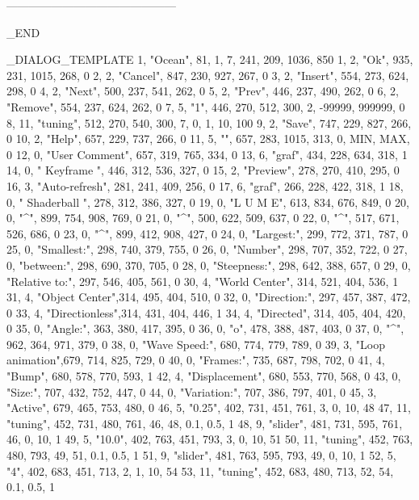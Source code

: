 ---------------------------------------------

_END


_DIALOG_TEMPLATE
1,	"Ocean", 81,	1,	7,	241, 209, 1036, 850
   1,	2,	"Ok",		935, 231, 1015, 268, 0
   2,	2,	"Cancel",	847, 230, 927, 267, 0
   3,	2,	"Insert",	554, 273, 624, 298, 0
   4,	2,	"Next",		500, 237, 541, 262, 0
   5,	2,	"Prev",		446, 237, 490, 262, 0
   6,	2,	"Remove",	554, 237, 624, 262, 0
   7,	5,	"1",		446, 270, 512, 300, 2, -99999, 999999, 0
   8,	11,	"tuning",	512, 270, 540, 300, 7, 0, 1, 10, 100
   9,	2,	"Save",		747, 229, 827, 266, 0
   10,	2,	"Help",		657, 229, 737, 266, 0
   11,	5,	"",		657, 283, 1015, 313, 0, MIN, MAX, 0
   12,	0,	"User Comment",	657, 319, 765, 334, 0
   13,	6,	"graf",		434, 228, 634, 318, 1
   14,	0,	" Keyframe ",	446, 312, 536, 327, 0
   15,	2,	"Preview",	278, 270, 410, 295, 0
   16,	3,	"Auto-refresh",	281, 241, 409, 256, 0
   17,	6,	"graf",		266, 228, 422, 318, 1
   18,	0,	" Shaderball ",	278, 312, 386, 327, 0
   19,	0,	"L U M E",	613, 834, 676, 849, 0
   20,	0,	"^",		899, 754, 908, 769, 0
   21,	0,	"^",		500, 622, 509, 637, 0
   22,	0,	"^",		517, 671, 526, 686, 0
   23,	0,	"^",		899, 412, 908, 427, 0
   24,	0,	"Largest:",	299, 772, 371, 787, 0
   25,	0,	"Smallest:",	298, 740, 379, 755, 0
   26,	0,	"Number",	298, 707, 352, 722, 0
   27,	0,	"between:",	298, 690, 370, 705, 0
   28,	0,	"Steepness:",	298, 642, 388, 657, 0
   29,	0,	"Relative to:",	297, 546, 405, 561, 0
   30,	4,	"World Center",	314, 521, 404, 536, 1
   31,	4,	"Object Center",314, 495, 404, 510, 0
   32,	0,	"Direction:",	297, 457, 387, 472, 0
   33,	4,	"Directionless",314, 431, 404, 446, 1
   34,	4,	"Directed",	314, 405, 404, 420, 0
   35,	0,	"Angle:",	363, 380, 417, 395, 0
   36,	0,	"o",		478, 388, 487, 403, 0
   37,	0,	"^",		962, 364, 971, 379, 0
   38,	0,	"Wave Speed:",	680, 774, 779, 789, 0
   39,	3,	"Loop animation",679, 714, 825, 729, 0
   40,	0,	"Frames:",	735, 687, 798, 702, 0
   41,	4,	"Bump",		680, 578, 770, 593, 1
   42,	4,	"Displacement",	680, 553, 770, 568, 0
   43,	0,	"Size:",	707, 432, 752, 447, 0
   44,	0,	"Variation:",	707, 386, 797, 401, 0
   45,	3,	"Active",	679, 465, 753, 480, 0
   46,	5,	"0.25",		402, 731, 451, 761, 3, 0, 10, 48
   47,	11,	"tuning",	452, 731, 480, 761, 46, 48, 0.1, 0.5, 1
   48,	9,	"slider",	481, 731, 595, 761, 46, 0, 10, 1
   49,	5,	"10.0",		402, 763, 451, 793, 3, 0, 10, 51
   50,	11,	"tuning",	452, 763, 480, 793, 49, 51, 0.1, 0.5, 1
   51,	9,	"slider",	481, 763, 595, 793, 49, 0, 10, 1
   52,	5,	"4",		402, 683, 451, 713, 2, 1, 10, 54
   53,	11,	"tuning",	452, 683, 480, 713, 52, 54, 0.1, 0.5, 1

